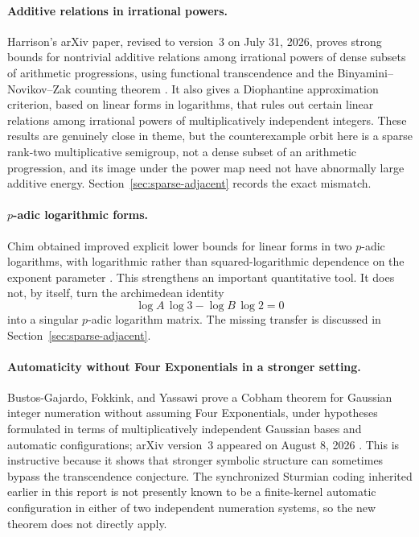 \documentclass[11pt,oneside]{article}
\theoremstyle{definition}
\theoremstyle{remark}
\begin{document}
\paragraph{Additive relations in irrational powers.}
Harrison's arXiv paper, revised to version~3 on July 31, 2026, proves strong bounds for
nontrivial additive relations among irrational powers of dense subsets of arithmetic
progressions, using functional transcendence and the Binyamini--Novikov--Zak counting theorem
\cite{Harrison2026}.  It also gives a Diophantine approximation criterion, based on linear
forms in logarithms, that rules out certain linear relations among irrational powers of
multiplicatively independent integers.  These results are genuinely close in theme, but the
counterexample orbit here is a sparse rank-two multiplicative semigroup, not a dense subset
of an arithmetic progression, and its image under the power map need not have abnormally
large additive energy.  Section~\ref{sec:sparse-adjacent} records the exact mismatch.

\paragraph{$p$-adic logarithmic forms.}
Chim obtained improved explicit lower bounds for linear forms in two $p$-adic logarithms,
with logarithmic rather than squared-logarithmic dependence on the exponent parameter
\cite{Chim2025}.  This strengthens an important quantitative tool.  It does not, by itself,
turn the archimedean identity
\[
  \log A\,\log3-\log B\,\log2=0
\]
into a singular $p$-adic logarithm matrix.  The missing transfer is discussed in
Section~\ref{sec:sparse-adjacent}.

\paragraph{Automaticity without Four Exponentials in a stronger setting.}
Bustos-Gajardo, Fokkink, and Yassawi prove a Cobham theorem for Gaussian integer numeration
without assuming Four Exponentials, under hypotheses formulated in terms of multiplicatively
independent Gaussian bases and automatic configurations; arXiv version~3 appeared on
August 8, 2026 \cite{BustosFokkinkYassawi2026}.  This is instructive because it shows that
stronger symbolic structure can sometimes bypass the transcendence conjecture.  The
synchronized Sturmian coding inherited earlier in this report is not presently known to be a
finite-kernel automatic configuration in either of two independent numeration systems, so
the new theorem does not directly apply.
\end{document}
